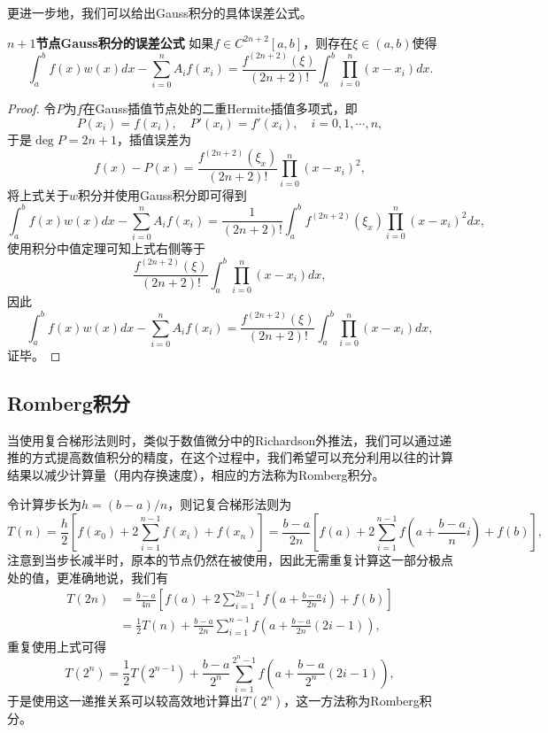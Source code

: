 \documentclass[a4paper,10pt]{ctexart}
\begin{document}
更进一步地，我们可以给出Gauss积分的具体误差公式。
\begin{theorem}{\normalfont\bf{$ n+1 $节点Gauss积分的误差公式}}
    如果$ f\in C^{2n+2}[a,b] $，则存在$ \xi\in (a,b) $使得
    \begin{equation}
        \int_a^b f(x)w(x)dx - \sum_{i=0}^n A_i f(x_i) = \frac{f^{(2n+2)}(\xi)}{(2n+2)!} \int_a^b \prod_{i=0}^n (x-x_i)dx.
    \end{equation}
\end{theorem}
\begin{proof}
    令$ P $为$ f $在Gauss插值节点处的二重Hermite插值多项式，即
    \[
        P(x_i) = f(x_i),\quad P'(x_i) = f'(x_i),\quad i=0,1,\cdots ,n,
    \]
    于是$ \deg P = 2n+1 $，插值误差为
    \[
        f(x) - P(x) = \frac{f^{(2n+2)}(\xi_x)}{(2n+2)!} \prod_{i=0}^n (x-x_i)^2,
    \]
    将上式关于$ w $积分并使用Gauss积分即可得到
    \[
        \int_a^b f(x)w(x)dx - \sum_{i=0}^n A_i f(x_i) = \frac{1}{(2n+2)!} \int_a^b f^{(2n+2)}(\xi_x)\prod_{i=0}^n (x-x_i)^2dx,
    \]
    使用积分中值定理可知上式右侧等于
    \[
        \frac{f^{(2n+2)}(\xi)}{(2n+2)!} \int_a^b \prod_{i=0}^n (x-x_i)dx,
    \]
    因此
    \[
        \int_a^b f(x)w(x)dx - \sum_{i=0}^n A_i f(x_i) = \frac{f^{(2n+2)}(\xi)}{(2n+2)!} \int_a^b \prod_{i=0}^n (x-x_i)dx,
    \]
    证毕。
\end{proof}

\subsection{Romberg积分}
当使用复合梯形法则时，类似于数值微分中的Richardson外推法，我们可以通过递推的方式提高数值积分的精度，在这个过程中，我们希望可以充分利用以往的计算结果以减少计算量（用内存换速度），相应的方法称为Romberg积分。

令计算步长为$ h = (b-a) / n $，则记复合梯形法则为
\begin{equation}
    T(n) = \frac{h}{2}\left[ f(x_0) + 2\sum_{i=1}^{n-1}f(x_i) + f(x_n) \right] = \frac{b-a}{2n} \left[ f(a) + 2\sum_{i=1}^{n-1}f(a+\frac{b-a}{n}i) + f(b) \right],
\end{equation}
注意到当步长减半时，原本的节点仍然在被使用，因此无需重复计算这一部分极点处的值，更准确地说，我们有
\begin{equation}
    \begin{aligned}
        T(2n) 
        &= \frac{b-a}{4n} \left[ f(a) + 2\sum_{i=1}^{2n-1}f(a+\frac{b-a}{2n}i) + f(b) \right]\\
        &= \frac{1}{2}T(n) + \frac{b-a}{2n} \sum_{i=1}^{n-1}f(a+\frac{b-a}{2n}(2i-1)),
    \end{aligned}
\end{equation}
重复使用上式可得
\begin{equation}
    T(2^n) = \frac{1}{2}T(2^{n-1}) + \frac{b-a}{2^n} \sum_{i=1}^{2^n-1}f(a+\frac{b-a}{2^n}(2i-1)),
\end{equation}
于是使用这一递推关系可以较高效地计算出$ T(2^n) $，这一方法称为Romberg积分。
\end{document}

